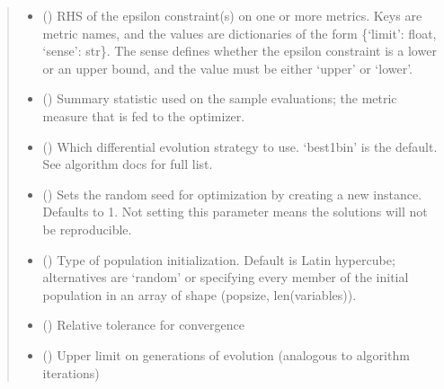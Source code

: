 \documentclass[letterpaper,10pt,english]{sphinxmanual}
\begin{document}
\begin{fulllineitems}
\begin{fulllineitems}
\begin{quote}
\begin{description}
\begin{itemize}
\item {} 
 () \textendash{} RHS of the epsilon constraint(s) on one or more metrics. Keys are metric
names, and the values are dictionaries of the form \{‘limit’: float, ‘sense’: str\}.
The sense defines whether the epsilon constraint is a lower or an upper bound,
and the value must be either ‘upper’ or ‘lower’.

\item {} 
 () \textendash{} Summary statistic used on the sample evaluations; the metric measure that
is fed to the optimizer.

\item {} 
 () \textendash{} Which differential evolution strategy to use. ‘best1bin’ is the default.
See algorithm docs for full list.

\item {} 
 () \textendash{} Sets the random seed for optimization by creating a new 
instance. Defaults to 1. Not setting this parameter means the solutions
will not be reproducible.

\item {} 
 () \textendash{} Type of population initialization. Default is Latin hypercube;
alternatives are ‘random’ or specifying every member of the initial
population in an array of shape (popsize, len(variables)).

\item {} 
 () \textendash{} Relative tolerance for convergence

\item {} 
 () \textendash{} Upper limit on generations of evolution (analogous to algorithm
iterations)


\end{itemize}
\end{description}
\end{quote}
\end{fulllineitems}
\end{fulllineitems}
\end{document}

